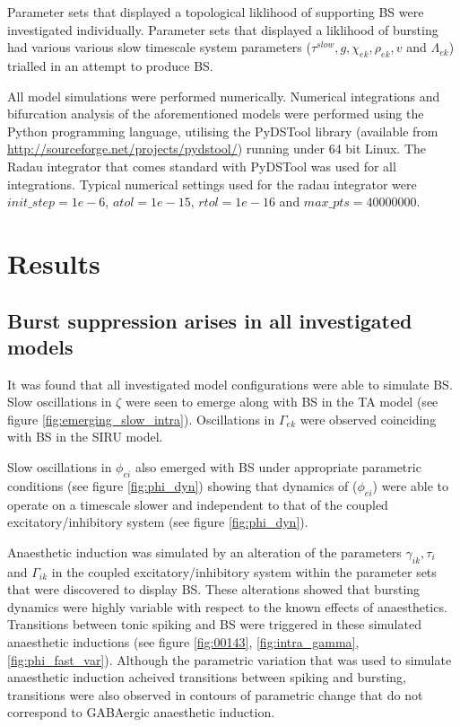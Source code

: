 \documentclass[a4paper,12pt]{article}
\begin{document}
Parameter sets that displayed a topological liklihood of supporting BS were investigated individually. Parameter sets that displayed a liklihood of bursting had various various slow timescale system parameters ($\tau^{slow}, g, \chi_{ek}, \rho_{ek}, v$ and $\Lambda_{ek}$) trialled in an attempt to produce BS. 

All model simulations were performed numerically. Numerical integrations and bifurcation analysis of the aforementioned models were performed using the Python programming language, utilising
the PyDSTool library (available from \url{http://sourceforge.net/projects/pydstool/}) running under 64 bit
Linux. The Radau integrator that comes standard with PyDSTool was used for all integrations.
Typical numerical settings used for the radau integrator were $init\_step = 1e-6$, $atol = 1e-15$, $rtol = 1e-16$ and
$max\_pts = 40000000$.

\section{Results}

\subsection{Burst suppression arises in all investigated models}
It was found that all investigated model configurations were able to simulate BS. Slow oscillations in $\zeta$ were seen to emerge along with BS in the TA model (see figure \ref{fig:emerging_slow_intra}). Oscillations in $\Gamma_{ek}$ were observed coinciding with BS in the SIRU model. 

Slow oscillations in $\phi_{ei}$ also emerged with BS under appropriate parametric conditions (see figure \ref{fig:phi_dyn}) showing that dynamics of ($\phi_{ei}$) were able to operate on a timescale slower and independent to that of the coupled  excitatory/inhibitory system (see figure \ref{fig:phi_dyn}).

Anaesthetic induction was simulated by an alteration of the parameters $\gamma_{ik}, \tau_i$ and $\Gamma_{ik}$ in the coupled excitatory/inhibitory system within the parameter sets that were discovered to display BS.  These alterations showed that bursting dynamics were highly variable with respect to the known effects of anaesthetics. Transitions between tonic spiking and BS were triggered in these simulated anaesthetic inductions (see figure \ref{fig:00143}, \ref{fig:intra_gamma}, \ref{fig:phi_fast_var}). Although the parametric variation that was used to simulate anaesthetic induction acheived transitions between spiking and bursting, transitions were also observed in contours of parametric change that do not correspond to GABAergic anaesthetic induction.
\end{document}
